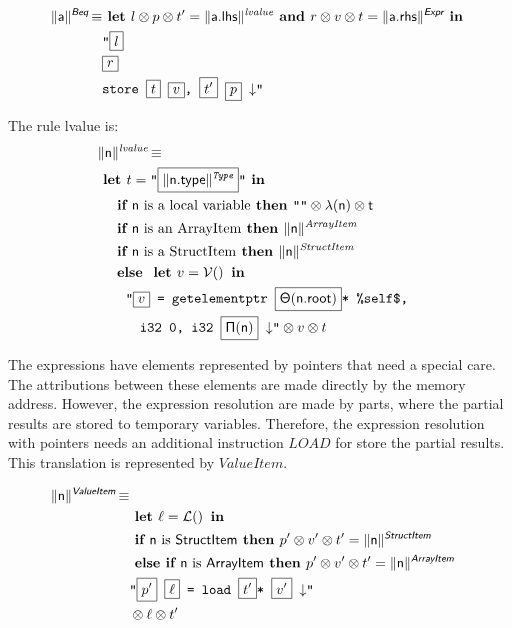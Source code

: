 \documentclass[10pt,a4paper]{article}
\newcommand{\trad}[2]{\ensuremath{\lVert \textsf{#1} \rVert^{\textit{#2}}}}
\newcommand{\nl}[0]{\ensuremath{\downarrow}}
\DeclareMathOperator{\isdef}{\equiv}
\DeclareMathOperator{\lbl}{\mathcal{L}()}
\DeclareMathOperator{\variable}{\mathcal{V}()}
\newcommand{\llvm}[1]{\texttt{#1}}
\newcommand{\B}[1]{\textsf{#1}}
\newcommand{\IF}[0]{\textbf{ if }}
\newcommand{\ELSIF}[0]{\textbf{ else if }}
\newcommand{\ELSE}[0]{\textbf{ else }}
\newcommand{\THEN}[0]{\textbf{ then }}
\newcommand{\LET}[0]{\textbf{ let }}
\newcommand{\IN}[0]{\textbf{ in }}
\newcommand{\AND}[0]{\textbf{ and }}
\newcommand{\PH}[1]{\framebox{$#1$}}
\newcommand{\sep}[0]{\otimes}
\newcommand{\local}[0]{\ensuremath{\sf\lambda}}
\newcommand{\idx}[0]{\ensuremath{\sf\Pi}}
\newcommand{\state}[0]{\ensuremath{\sf\Theta}}
\begin{document}
\begin{align*}
\begin{split}
  \trad{a}{\B{Beq}} \isdef
  & \LET l \sep p \sep t'= \trad{a.lhs}{lvalue} \AND r \sep v \sep t = \trad{a.rhs}{\B{Expr}} \IN \\
  & \llvm{"\PH{l}} \\
  & \llvm{\PH{r}} \\
  & \llvm{store \PH{t} \PH{v}, \PH{t'} \PH{p} \nl"}
\end{split}
\end{align*}

The rule lvalue is:
\begin{align*}
\lefteqn{\trad{n}{lvalue} \isdef} \\
& \LET t = \llvm{"\PH{\trad{\B{n.type}}{Type}}"} \IN \\
& \quad \IF \mbox{\B{n} is a local variable} \THEN \llvm{""} \sep \local(\B{n}) \sep t \\
& \quad \IF \mbox{\B{n} is an ArrayItem} \THEN  \trad{n}{ArrayItem} \\
& \quad \IF \mbox{\B{n} is a StructItem} \THEN  \trad{n}{StructItem} \\
& \quad \ELSE \LET v = \variable \IN \\
& \quad \quad \llvm{"\PH{v} = getelementptr \PH{\state(\B{n.root})}* \%self\$,} \\
& \quad \quad \quad \llvm{i32 0, i32 \PH{\idx(\B{n})} \nl"} \sep v \sep t
\end{align*}

The expressions have elements represented by pointers that need a special 
care. The attributions between these elements are made  directly by the memory 
address.  However, the expression resolution are made by parts, where the 
partial results are stored to temporary variables. Therefore, the expression 
resolution with pointers needs an additional instruction $LOAD$ for store the 
partial results. This translation is represented by $ValueItem$.

\begin{align*}
\begin{split}
  \trad{n}{\B{ValueItem}} \isdef \\
   & \LET \ell = \lbl  \IN\\
   & \IF \B{n} \mbox{ is \B{StructItem}} \THEN p' \sep v' \sep t' = \trad{\B{n}}{\B{StructItem}} \\
   & \ELSIF \B{n} \mbox{ is \B{ArrayItem}} \THEN p' \sep v' \sep t' = \trad{\B{n}}{\B{ArrayItem}} \\
   & \llvm{"\PH{p'} \PH{\ell}  = load  \PH{t'}* \PH{v'} \nl"} \\
   & \sep  \ell  \sep t'\\
\end{split}
\end{align*}
\end{document}
